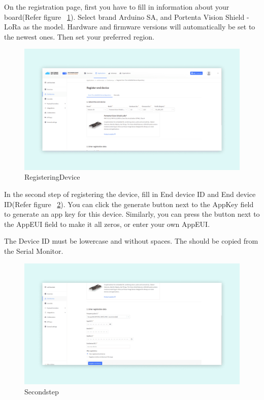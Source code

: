 \begin{itemize}
		On the registration page, first you have to fill in information about your board(Refer figure ~\ref{RegisteringDevice}). Select brand Arduino SA, and Portenta Vision Shield - LoRa as the model. Hardware and firmware versions will automatically be set to the newest ones. Then set your preferred region.
		
		\begin{figure}
			\begin{center}
				\includegraphics[width=0.7\linewidth]{Images/LORA/DeviceEUI.png}
				\caption{RegisteringDevice}
				\label{RegisteringDevice} 
			\end{center}
		\end{figure}
		
		In the second step of registering the device, fill in End device ID and End device ID(Refer figure ~\ref{Secondstep}). You can click the generate button next to the AppKey field to generate an app key for this device. Similarly, you can press the button next to the AppEUI field to make it all zeros, or enter your own AppEUI.
		
		 The Device ID must be lowercase and without spaces. The  should be copied from the Serial Monitor. 
		
		\begin{figure}
			\begin{center}
				\includegraphics[width=0.7\linewidth]{Images/LORA/Secondstep.png}
				\caption{Secondstep}
				\label{Secondstep} 
			\end{center}
		\end{figure}
		

\end{itemize}
